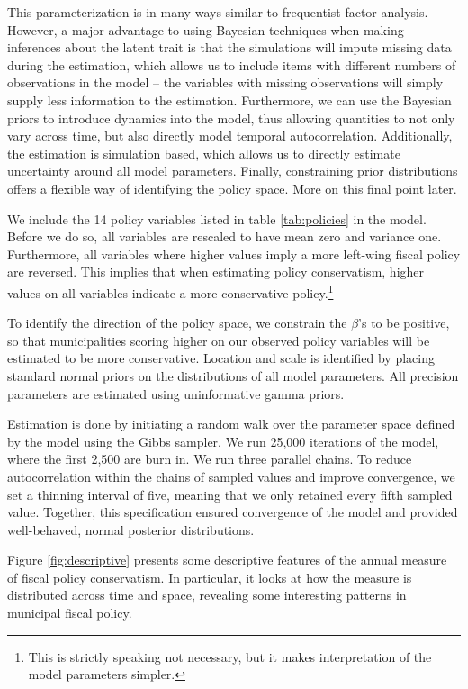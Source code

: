 \documentclass[a4paper,12pt]{article}
\begin{document}
This parameterization is in many ways similar to frequentist factor analysis. However, a major advantage to using Bayesian techniques when making inferences about the latent trait is that the simulations will impute missing data during the estimation, which allows us to include items with different numbers of observations in the model -- the variables with missing observations will simply supply less information to the estimation. Furthermore, we can use the Bayesian priors to introduce dynamics into the model, thus allowing quantities to not only vary across time, but also directly model temporal autocorrelation. Additionally, the estimation is simulation based, which allows us to directly estimate uncertainty around all model parameters. Finally, constraining prior distributions offers a flexible way of identifying the policy space. More on this final point later.

We include the 14 policy variables listed in table  \ref{tab:policies} in the model. Before we do so, all variables are rescaled to have mean zero and variance one. Furthermore, all variables where higher values imply a more left-wing fiscal policy are reversed. This implies that when estimating policy conservatism, higher values on all variables indicate a more conservative policy.\footnote{This is strictly speaking not necessary, but it makes interpretation of the model parameters simpler.}

To identify the direction of the policy space, we constrain the $\beta$'s to be positive, so that municipalities scoring higher on our observed policy variables will be estimated to be more conservative. Location and scale is identified by placing standard normal priors on the distributions of all model parameters. All precision parameters are estimated using uninformative gamma priors.

Estimation is done by initiating a random walk over the parameter space defined by the model using the Gibbs sampler. We run 25,000 iterations of the model, where the first 2,500 are burn in. We run three parallel chains. To reduce autocorrelation within the chains of sampled values and improve convergence, we set a thinning interval of five, meaning that we only retained every fifth sampled value. Together, this specification ensured  convergence of the model and provided well-behaved, normal posterior distributions.

Figure \ref{fig:descriptive} presents some descriptive features of the annual measure of fiscal policy conservatism. In particular, it looks at how the measure is distributed across time and space, revealing some interesting patterns in municipal fiscal policy.
\end{document}
